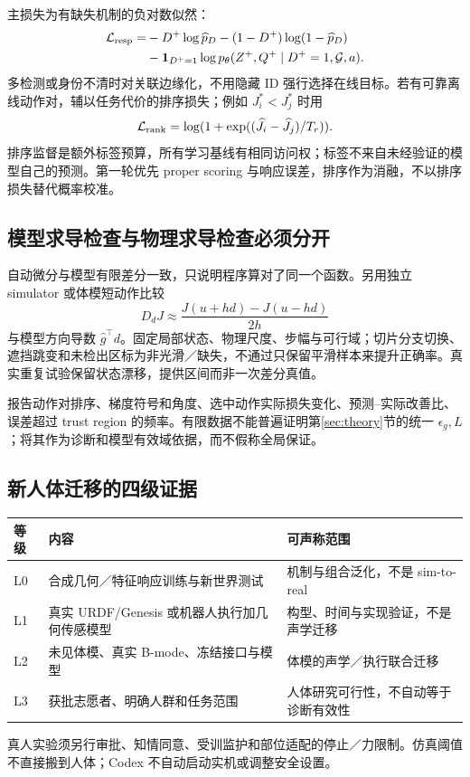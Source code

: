 \documentclass[UTF8,fontset=fandol,11pt,a4paper]{ctexart}
\theoremstyle{plain}
\theoremstyle{definition}
\theoremstyle{remark}
\numberwithin{equation}{section}
\newcommand{\G}{\mathcal G}
\begin{document}
主损失为有缺失机制的负对数似然：
\begin{equation}
\begin{split}
\mathcal L_{\rm resp}=&-D^+\log\widehat p_D-(1-D^+)\log(1-\widehat p_D)\\
&-\mathbf1_{D^+=1}\log p_\theta(Z^+,Q^+\mid D^+=1,\G,a).
\end{split}
\label{eq:loss}
\end{equation}
多检测或身份不清时对关联边缘化，不用隐藏 ID 强行选择在线目标。若有可靠离线动作对，辅以任务代价的排序损失；例如 $J_i^*<J_j^*$ 时用
\begin{equation}
\mathcal L_{\rm rank}=\log(1+\exp((\widehat J_i-\widehat J_j)/T_r)).
\end{equation}
排序监督是额外标签预算，所有学习基线有相同访问权；标签不来自未经验证的模型自己的预测。第一轮优先 proper scoring 与响应误差，排序作为消融，不以排序损失替代概率校准。

\subsection{模型求导检查与物理求导检查必须分开}
自动微分与模型有限差分一致，只说明程序算对了同一个函数。另用独立 simulator 或体模短动作比较
\begin{equation}
D_dJ\approx\frac{J(u+hd)-J(u-hd)}{2h}
\end{equation}
与模型方向导数 $\widehat g^\top d$。固定局部状态、物理尺度、步幅与可行域；切片分支切换、遮挡跳变和未检出区标为非光滑／缺失，不通过只保留平滑样本来提升正确率。真实重复试验保留状态漂移，提供区间而非一次差分真值。

报告动作对排序、梯度符号和角度、选中动作实际损失变化、预测--实际改善比、误差超过 trust region 的频率。有限数据不能普遍证明第\ref{sec:theory}节的统一 $\epsilon_g,L$；将其作为诊断和模型有效域依据，而不假称全局保证。

\subsection{新人体迁移的四级证据}
\begin{table}[htbp]\centering\small
\begin{tabularx}{\linewidth}{P{15mm}YY}\toprule
等级 & 内容 & 可声称范围\\\midrule
L0 & 合成几何／特征响应训练与新世界测试 & 机制与组合泛化，不是 sim-to-real\\
L1 & 真实 URDF/Genesis 或机器人执行加几何传感模型 & 构型、时间与实现验证，不是声学迁移\\
L2 & 未见体模、真实 B-mode、冻结接口与模型 & 体模的声学／执行联合迁移\\
L3 & 获批志愿者、明确人群和任务范围 & 人体研究可行性，不自动等于诊断有效性\\\bottomrule
\end{tabularx}
\end{table}
真人实验须另行审批、知情同意、受训监护和部位适配的停止／力限制。仿真阈值不直接搬到人体；Codex 不自动启动实机或调整安全设置。
\end{document}
